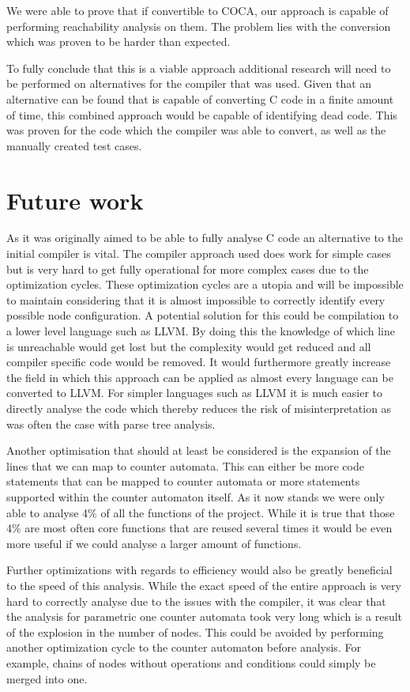 \documentclass[12pt]{article}
\begin{document}
We were able to prove that if convertible to COCA, our approach is capable of performing reachability analysis on them. The problem lies with the conversion which was proven to be harder than expected. 

To fully conclude that this is a viable approach additional research will need to be performed on alternatives for the compiler that was used. Given that an alternative can be found that is capable of converting C code in a finite amount of time, this combined approach would be capable of identifying dead code. This was proven for the code which the compiler was able to convert, as well as the manually created test cases.

\section{Future work}
As it was originally aimed to be able to fully analyse C code an alternative to the initial compiler is vital. The compiler approach used does work for simple cases but is very hard to get fully operational for more complex cases due to the optimization cycles. These optimization cycles are a utopia and will be impossible to maintain considering that it is almost impossible to correctly identify every possible node configuration. A potential solution for this could be compilation to a lower level language such as LLVM. By doing this the knowledge of which line is unreachable would get lost but the complexity would get reduced and all compiler specific code would be removed. It would furthermore greatly increase the field in which this approach can be applied as almost every language can be converted to LLVM. For simpler languages such as LLVM it is much easier to directly analyse the code which thereby reduces the risk of misinterpretation as was often the case with parse tree analysis.

Another optimisation that should at least be considered is the expansion of the lines that we can map to counter automata. This can either be more code statements that can be mapped to counter automata or more statements supported within the counter automaton itself. As it now stands we were only able to analyse 4\% of all the functions of the project. While it is true that those 4\% are most often core functions that are reused several times it would be even more useful if we could analyse a larger amount of functions.

Further optimizations with regards to efficiency would also be greatly beneficial to the speed of this analysis. While the exact speed of the entire approach is very hard to correctly analyse due to the issues with the compiler, it was clear that the analysis for parametric one counter automata took very long which is a result of the explosion in the number of nodes. This could be avoided by performing another optimization cycle to the counter automaton before analysis. For example, chains of nodes without operations and conditions could simply be merged into one.
\end{document}

